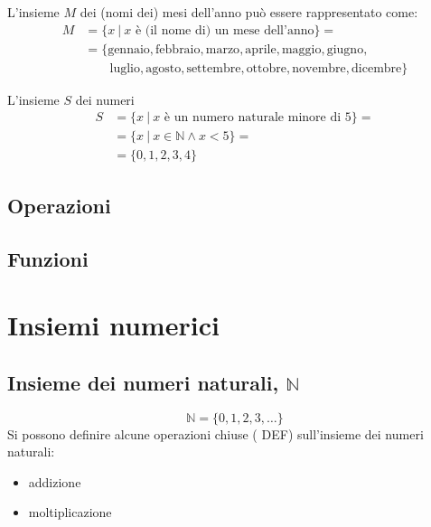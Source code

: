 \begin{example} L'insieme $M$ dei (nomi dei) mesi dell'anno può essere rappresentato come:
\begin{equation}
\begin{aligned}
    M & = \{ x \ | \ \text{$x$ è (il nome di) un mese dell'anno} \} = \\
      & = \{ \text{gennaio}, \text{febbraio}, \text{marzo}, \text{aprile}, \text{maggio}, \text{giugno}, \\
      & \qquad \text{luglio}, \text{agosto}, \text{settembre}, \text{ottobre}, \text{novembre}, \text{dicembre}  \} 
\end{aligned}
\end{equation}
\end{example}
\begin{example} L'insieme $S$ dei numeri
\begin{equation}
\begin{aligned}
    S & = \{ x \ | \ \text{$x$ è un numero naturale minore di 5} \} = \\
      & = \{ x \ | \ x \in \mathbb{N} \land x < 5 \} = \\
      & = \{ 0, 1, 2, 3, 4 \}
\end{aligned}
\end{equation}
\end{example}

\section{Operazioni}

\section{Funzioni}

\chapter{Insiemi numerici}
\section{Insieme dei numeri naturali, $\mathbb{N}$}
\begin{equation}
    \mathbb{N} = \{ 0, 1, 2, 3, \dots \}
\end{equation}
Si possono definire alcune operazioni chiuse ({\color{red} DEF}) sull'insieme dei numeri naturali:
\begin{itemize}
    \item addizione
    \item moltiplicazione
\end{itemize}

